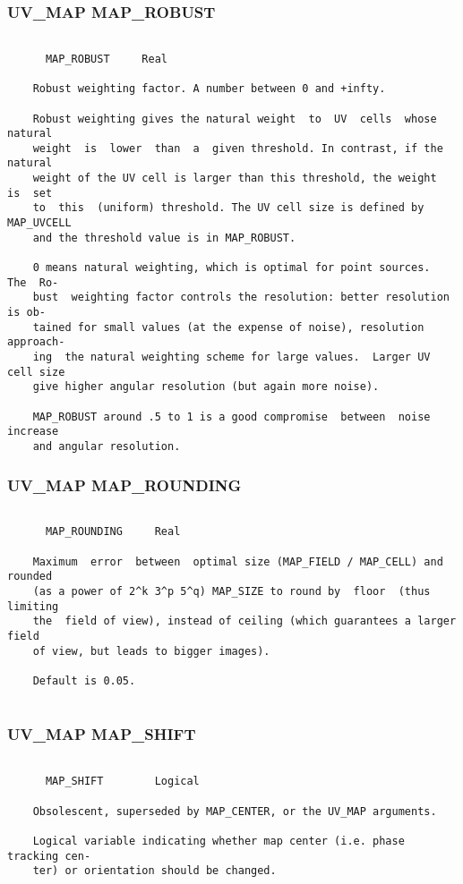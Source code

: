 \subsubsection{UV\_MAP MAP\_ROBUST}
\begin{verbatim}

      MAP_ROBUST     Real

    Robust weighting factor. A number between 0 and +infty.

    Robust weighting gives the natural weight  to  UV  cells  whose  natural
    weight  is  lower  than  a  given threshold. In contrast, if the natural
    weight of the UV cell is larger than this threshold, the weight  is  set
    to  this  (uniform) threshold. The UV cell size is defined by MAP_UVCELL
    and the threshold value is in MAP_ROBUST.

    0 means natural weighting, which is optimal for point sources.  The  Ro-
    bust  weighting factor controls the resolution: better resolution is ob-
    tained for small values (at the expense of noise), resolution  approach-
    ing  the natural weighting scheme for large values.  Larger UV cell size
    give higher angular resolution (but again more noise).

    MAP_ROBUST around .5 to 1 is a good compromise  between  noise  increase
    and angular resolution.

\end{verbatim}
\subsubsection{UV\_MAP MAP\_ROUNDING}
\begin{verbatim}

      MAP_ROUNDING     Real

    Maximum  error  between  optimal size (MAP_FIELD / MAP_CELL) and rounded
    (as a power of 2^k 3^p 5^q) MAP_SIZE to round by  floor  (thus  limiting
    the  field of view), instead of ceiling (which guarantees a larger field
    of view, but leads to bigger images).

    Default is 0.05.


\end{verbatim}
\subsubsection{UV\_MAP MAP\_SHIFT}
\begin{verbatim}

      MAP_SHIFT        Logical

    Obsolescent, superseded by MAP_CENTER, or the UV_MAP arguments.

    Logical variable indicating whether map center (i.e. phase tracking cen-
    ter) or orientation should be changed.

\end{verbatim}
